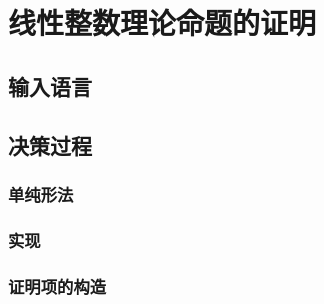 \chapter{线性整数理论命题的证明}
\label{chap:lia}

\section{输入语言}

\section{决策过程}
\subsection{单纯形法}
\subsection{实现}
\subsection{证明项的构造}
